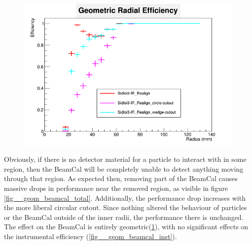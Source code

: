 \documentclass{report}
\begin{document}
                \begin{figure}[H]
                    \includegraphics[width=\textwidth]{RadialEfficiency_geometric_geom}
                    \centering
                    \caption{}
                    \label{fig__geom_beamcal_geom}
                \end{figure}

                Obviously, if there is no detector material for a particle to interact with in some region, then the BeamCal will be completely unable to detect anything moving through that region. As expected then, removing part of the BeamCal causes massive drops in performance near the removed region, as visible in figure \ref{fig__geom_beamcal_total}. Additionally, the performance drop increases with the more liberal circular cutout. Since nothing altered the behaviour of particles or the BeamCal outside of the inner radii, the performance there is unchanged. The effect on the BeamCal is entirely geometric(\ref{fig__geom_beamcal_geom}), with no significant effects on the instrumental efficiency (\ref{fig__geom_beamcal_inst}).
                
\end{document}
